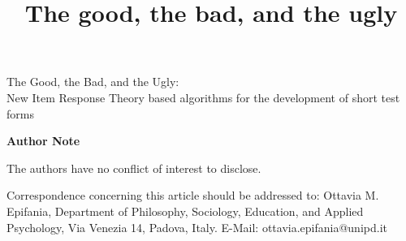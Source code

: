 \documentclass[12pt, a4paper, titilepage]{article}
\title{The good, the bad, and the ugly}
\author{}
\begin{document}
\vspace*{10mm}
\begin{center}
	\begin{LARGE}
	The Good, the Bad, and the Ugly: \\ New Item Response Theory based algorithms for the development of short test forms
	\end{LARGE}
	
	\vspace{5mm}
	\begin{large}
	\end{large}
\end{center}
\vspace{15mm}
\begin{center}
	\textbf{Author Note}
\end{center}
\begin{small}
	
%	
%	
	
	
	The authors have no conflict of interest to disclose.
	
	
	
	Correspondence concerning this article should be addressed to: Ottavia M. Epifania, Department of Philosophy, Sociology, Education, and Applied Psychology, Via Venezia 14, Padova, Italy.
	E-Mail: ottavia.epifania@unipd.it \\
\end{small}


\vfill


\newpage
\end{document}
